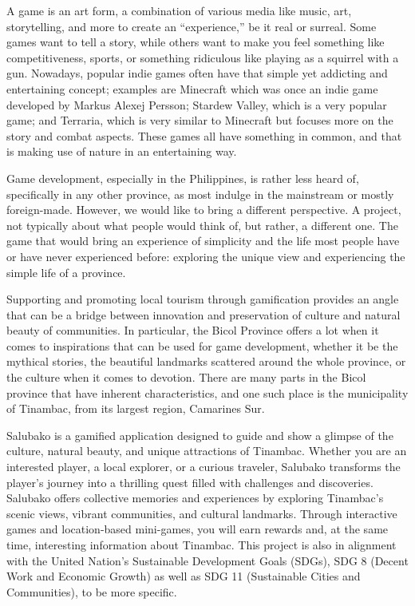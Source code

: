 \documentclass{research}
\begin{document}
A game is an art form, a combination of various media like music, art, storytelling,
and more to create an ``experience,'' be it real or surreal. Some games want to tell a
story, while others want to make you feel something like competitiveness, sports, or
something ridiculous like playing as a squirrel with a gun. Nowadays, popular indie
games often have that simple yet addicting and entertaining concept; examples are
Minecraft which was once an indie game developed by Markus Alexej Persson; Stardew
Valley, which is a very popular game; and Terraria, which is very similar to Minecraft
but focuses more on the story and combat aspects. These games all have something in
common, and that is making use of nature in an entertaining way.

Game development, especially in the Philippines, is rather less heard of, specifically
in any other province, as most indulge in the mainstream or mostly foreign-made.
However, we would like to bring a different perspective. A project, not typically about
what people would think of, but rather, a different one. The game that would bring an
experience of simplicity and the life most people have or have never experienced before:
exploring the unique view and experiencing the simple life of a province.

Supporting and promoting local tourism through gamification provides an angle that
can be a bridge between innovation and preservation of culture and natural beauty of
communities. In particular, the Bicol Province offers a lot when it comes to inspirations
that can be used for game development, whether it be the mythical stories, the beautiful
landmarks scattered around the whole province, or the culture when it comes to devotion.
There are many parts in the Bicol province that have inherent characteristics, and one
such place is the municipality of Tinambac, from its largest region, Camarines Sur.

Salubako is a gamified application designed to guide and show a glimpse of the culture,
natural beauty, and unique attractions of Tinambac. Whether you are an interested
player, a local explorer, or a curious traveler, Salubako transforms the player's
journey into a thrilling quest filled with challenges and discoveries. Salubako offers
collective memories and experiences by exploring Tinambac's scenic views, vibrant
communities, and cultural landmarks. Through interactive games and location-based
mini-games, you will earn rewards and, at the same time, interesting information about
Tinambac. This project is also in alignment with the United Nation's Sustainable
Development Goals (SDGs), SDG 8 (Decent Work and Economic Growth) as well as SDG 11
(Sustainable Cities and Communities), to be more specific.
\end{document}
